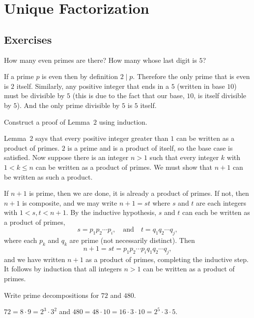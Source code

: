 \chapter{Unique Factorization}

\section{Exercises}

 How many even primes are there? How many whose last digit
is $5$?
\begin{solution}
  If a prime $p$ is even then by definition $2\mid p$. Therefore the
  only prime that is even is $2$ itself. Similarly, any positive
  integer that ends in a $5$ (written in base $10$) must be divisible
  by $5$ (this is due to the fact that our base, $10$, is itself
  divisible by $5$). And the only prime divisible by $5$ is $5$
  itself.
\end{solution}

 Construct a proof of Lemma~$2$ using induction.
\begin{solution}
  Lemma~$2$ says that every positive integer greater than $1$ can be
  written as a product of primes. $2$ is a prime and is a product of
  itself, so the base case is satisfied. Now suppose there is an
  integer $n>1$ such that every integer $k$ with $1<k\leq n$ can be
  written as a product of primes. We must show that $n+1$ can be
  written as such a product.

  If $n+1$ is prime, then we are done, it is already a product of
  primes. If not, then $n+1$ is composite, and we may write $n+1 = st$
  where $s$ and $t$ are each integers with $1<s,t<n+1$. By the
  inductive hypothesis, $s$ and $t$ can each be written as a product
  of primes,
  \begin{equation*}
    s = p_1p_2\cdots p_i,
    \quad\text{and}\quad
    t = q_1q_2\cdots q_j,
  \end{equation*}
  where each $p_k$ and $q_k$ are prime (not necessarily
  distinct). Then
  \begin{equation*}
    n+1 = st = p_1p_2\cdots p_iq_1q_2\cdots q_j,
  \end{equation*}
  and we have written $n+1$ as a product of primes, completing the
  inductive step. It follows by induction that all integers $n>1$ can
  be written as a product of primes.
\end{solution}

 Write prime decompositions for $72$ and $480$.
\begin{solution}
  $72 = 8\cdot9 = 2^3\cdot3^2$ and
  $480 = 48\cdot10 = 16\cdot3\cdot10 = 2^5\cdot3\cdot5$.
\end{solution}

